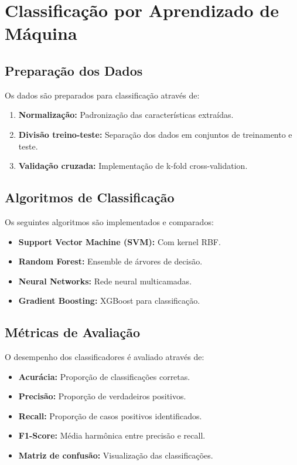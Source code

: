 \section{Classificação por Aprendizado de Máquina}

\subsection{Preparação dos Dados}

Os dados são preparados para classificação através de:

\begin{enumerate}
    \item \textbf{Normalização:} Padronização das características extraídas.
    \item \textbf{Divisão treino-teste:} Separação dos dados em conjuntos de treinamento e teste.
    \item \textbf{Validação cruzada:} Implementação de k-fold cross-validation.
\end{enumerate}

\subsection{Algoritmos de Classificação}

Os seguintes algoritmos são implementados e comparados:

\begin{itemize}
    \item \textbf{Support Vector Machine (SVM):} Com kernel RBF.
    \item \textbf{Random Forest:} Ensemble de árvores de decisão.
    \item \textbf{Neural Networks:} Rede neural multicamadas.
    \item \textbf{Gradient Boosting:} XGBoost para classificação.
\end{itemize}

\subsection{Métricas de Avaliação}

O desempenho dos classificadores é avaliado através de:

\begin{itemize}
    \item \textbf{Acurácia:} Proporção de classificações corretas.
    \item \textbf{Precisão:} Proporção de verdadeiros positivos.
    \item \textbf{Recall:} Proporção de casos positivos identificados.
    \item \textbf{F1-Score:} Média harmônica entre precisão e recall.
    \item \textbf{Matriz de confusão:} Visualização das classificações.
\end{itemize}

